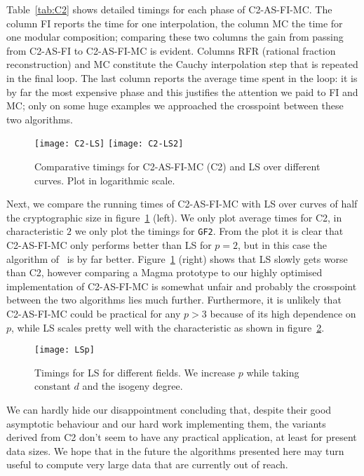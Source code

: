 Table~\ref{tab:C2} shows detailed timings for each phase of
C2-AS-FI-MC. The column FI reports the time for one interpolation, the
column MC the time for one modular composition; comparing these two
columns the gain from passing from C2-AS-FI to C2-AS-FI-MC is
evident. Columns RFR (rational fraction reconstruction) and MC
constitute the Cauchy interpolation step that is repeated in the final
loop. The last column reports the average time spent in the loop: it
is by far the most expensive phase and this justifies the attention we
paid to FI and MC; only on some huge examples we approached the
crosspoint between these two algorithms.

\begin{figure}
  \centering
  \texttt{[image: C2-LS]}
   \texttt{[image: C2-LS2]}
   \caption{Comparative timings for C2-AS-FI-MC (C2) and LS over
     different curves. Plot in logarithmic scale.}
  \label{fig:comp}
\end{figure}

Next, we compare the running times of C2-AS-FI-MC with LS over curves
of half the cryptographic size in figure~\ref{fig:comp} (left). We
only plot average times for C2, in characteristic $2$ we only plot the
timings for \texttt{GF2}. From the plot it is clear that C2-AS-FI-MC
only performs better than LS for $p=2$, but in this case the algorithm
of~\cite{Ler96} is by far better.  Figure~\ref{fig:comp} (right) shows
that LS slowly gets worse than C2, however comparing a Magma prototype
to our highly optimised implementation of C2-AS-FI-MC is somewhat
unfair and probably the crosspoint between the two algorithms lies
much further. Furthermore, it is unlikely that C2-AS-FI-MC could be
practical for any $p>3$ because of its high dependence on $p$, while
LS scales pretty well with the characteristic as shown in
figure~\ref{fig:LSp}.

\begin{figure}
  \centering
  \texttt{[image: LSp]}
  \caption{Timings for LS for different fields. We increase
    $p$ while taking constant $d$ and the isogeny degree.}
  \label{fig:LSp}
\end{figure}

We can hardly hide our disappointment concluding that, despite their
good asymptotic behaviour and our hard work implementing them, the
variants derived from C2 don't seem to have any practical application,
at least for present data sizes. We hope that in the future the
algorithms presented here may turn useful to compute very large data
that are currently out of reach.




%
